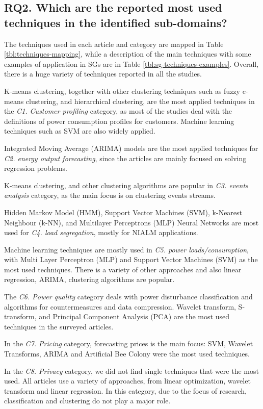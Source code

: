 \documentclass[journal]{IEEEtran}
\begin{document}
\subsection{RQ2. Which are the reported most used techniques in the identified sub-domains?}
\label{sec:RQ4}
The techniques used in each article and category are mapped in Table \ref{tbl:techniques-mapping}, while a description of the main techniques with some examples of application in SGs are in Table \ref{tbl:sg-techniques-examples}. Overall, there is a huge variety of techniques reported in all the studies.

K-means clustering, together with other clustering techniques such as fuzzy c-means clustering, and hierarchical clustering, are the most applied techniques in the \textit{C1. Customer profiling} category, as most of the studies deal with the definitions of power consumption profiles for customers. Machine learning techniques such as SVM are also widely applied.

Integrated Moving Average (ARIMA) models are the most applied techniques  for \textit{C2. energy output forecasting}, since the articles are mainly focused on solving regression problems.

K-means clustering, and other clustering algorithms are popular in \textit{C3. events analysis} category, as the main focus is on clustering events streams.

Hidden Markov Model (HMM), Support Vector Machines (SVM), k-Nearest Neighbour (k-NN), and Multilayer Perceptrons (MLP) Neural Networks are most used for \textit{C4. load segregation}, mostly for NIALM applications.

Machine learning techniques are mostly used in \textit{C5. power loads/consumption}, with Multi Layer Perceptron (MLP) and Support Vector Machines (SVM) as the most used techniques. There is a variety of other approaches and also linear regression, ARIMA, clustering algorithms are popular.

The \textit{C6. Power quality} category deals with power disturbance classification and algorithms for countermeasures and data compression. Wavelet transform, S-transform, and Principal Component Analysis (PCA) are the most used techniques in the surveyed articles.

In the \textit{C7. Pricing} category, forecasting prices is the main focus: SVM, Wavelet Transforms, ARIMA and Artificial Bee Colony were the most used techniques.

In the \textit{C8. Privacy} category, we did not find single techniques that were the most used. All articles use a variety of approaches, from linear optimization, wavelet transform and linear regression. In this category, due to the focus of research, classification and clustering do not play a major role.
\end{document}
